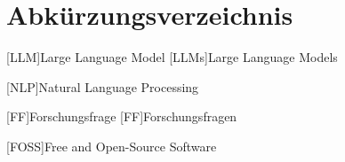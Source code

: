 \section*{Abkürzungsverzeichnis}
\begin{acronym}

    [LLM]{Large Language Model}
    [LLMs]{Large Language Models}

    [NLP]{Natural Language Processing}

    [FF]{Forschungsfrage}
    [FF]{Forschungsfragen}

    [FOSS]{Free and Open-Source Software}
\end{acronym}